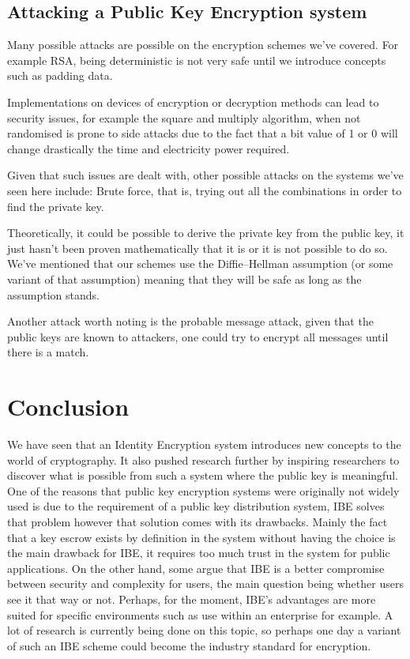 \documentclass[conference]{IEEEtran}
\begin{document}
\subsection{Attacking a Public Key Encryption system}
Many possible attacks are possible on the encryption schemes we've covered.
For example RSA, being deterministic is not very safe until we introduce concepts such as 
padding data. 

Implementations on devices of encryption or decryption methods 
can lead to security issues, for example the square and multiply algorithm,
when not randomised is prone to side attacks due to the fact that a bit value of 1 or 0 
will change drastically the time and electricity power required.

Given that such issues are dealt with, other possible attacks on the systems we've seen here include: 
Brute force, that is, trying out all the combinations in order to find the private key.

Theoretically, it could be possible to derive the private key from the public key, it just 
hasn't been proven mathematically that it is or it is not possible to do so.
We've mentioned that our schemes use the Diffie–Hellman assumption (or some variant of that assumption)
meaning that they will be safe as long as the assumption stands.

Another attack worth noting is the probable message attack, given that the public keys are known 
to attackers, one could try to encrypt all messages until there is a match.


\section{Conclusion}
We have seen that an Identity Encryption system 
introduces new concepts to the world of cryptography.
It also pushed research further by inspiring researchers
to discover what is possible from such a system where the public key is 
meaningful. One of the reasons that public key encryption systems 
were originally not widely used is due to the requirement of a public key 
distribution system, IBE solves that problem however that solution comes with 
its drawbacks. Mainly the fact that a key escrow exists by definition in the system 
without having the choice is the main drawback for IBE, it requires too much 
trust in the system for public applications. On the other hand, some argue that 
IBE is a better compromise between security and complexity for users, the main 
question being whether users see it that way or not.
Perhaps, for the moment, IBE's advantages are more suited for specific 
environments such as use within an enterprise for example.  
A lot of research is currently being done on this topic, so perhaps one day a variant 
of such an IBE scheme could become the industry standard for encryption.
\end{document}
